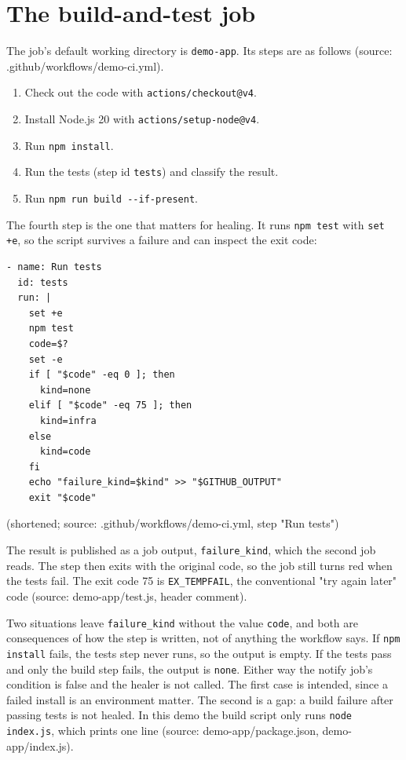 \documentclass[11pt,a4paper]{report}
\begin{document}
\section{The build-and-test job}

The job's default working directory is \texttt{demo-\allowbreak{}app}. Its steps are as follows (source: .github/workflows/demo-ci.yml).

\begin{enumerate}[leftmargin=*,itemsep=2pt]
\item Check out the code with \texttt{actions/\allowbreak{}checkout@v4}.
\item Install Node.js 20 with \texttt{actions/\allowbreak{}setup-\allowbreak{}node@v4}.
\item Run \texttt{npm install}.
\item Run the tests (step id \texttt{tests}) and classify the result.
\item Run \texttt{npm run build -\allowbreak{}-\allowbreak{}if-\allowbreak{}present}.
\end{enumerate}

The fourth step is the one that matters for healing. It runs \texttt{npm test} with \texttt{set +e}, so the script survives a failure and can inspect the exit code:

\begin{lstlisting}
- name: Run tests
  id: tests
  run: |
    set +e
    npm test
    code=$?
    set -e
    if [ "$code" -eq 0 ]; then
      kind=none
    elif [ "$code" -eq 75 ]; then
      kind=infra
    else
      kind=code
    fi
    echo "failure_kind=$kind" >> "$GITHUB_OUTPUT"
    exit "$code"
\end{lstlisting}

(shortened; source: .github/workflows/demo-ci.yml, step "Run tests")

The result is published as a job output, \texttt{failure\_\allowbreak{}kind}, which the second job reads. The step then exits with the original code, so the job still turns red when the tests fail. The exit code 75 is \texttt{EX\_\allowbreak{}TEMPFAIL}, the conventional "try again later" code (source: demo-app/test.js, header comment).

Two situations leave \texttt{failure\_\allowbreak{}kind} without the value \texttt{code}, and both are consequences of how the step is written, not of anything the workflow says. If \texttt{npm install} fails, the tests step never runs, so the output is empty. If the tests pass and only the build step fails, the output is \texttt{none}. Either way the notify job's condition is false and the healer is not called. The first case is intended, since a failed install is an environment matter. The second is a gap: a build failure after passing tests is not healed. In this demo the build script only runs \texttt{node index.\allowbreak{}js}, which prints one line (source: demo-app/package.json, demo-app/index.js).
\end{document}
